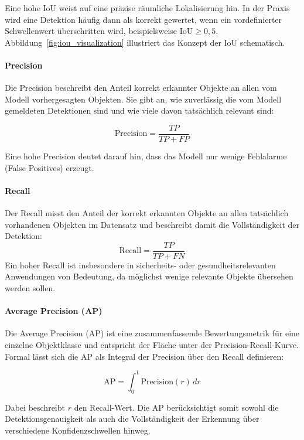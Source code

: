 Eine hohe IoU weist auf eine präzise räumliche Lokalisierung hin. In der Praxis
wird eine Detektion häufig dann als korrekt gewertet, wenn ein vordefinierter
Schwellenwert überschritten wird, beispielsweise $\text{IoU} \geq 0{,}5$.
Abbildung~\ref{fig:iou_visualization} illustriert das Konzept der IoU
schematisch.

\paragraph{Precision}
Die Precision beschreibt den Anteil korrekt erkannter Objekte an allen vom Modell
vorhergesagten Objekten. Sie gibt an, wie zuverlässig die vom Modell gemeldeten
Detektionen sind und wie viele davon tatsächlich relevant sind:

\begin{equation}
    \text{Precision} = \frac{TP}{TP + FP}
\end{equation}

Eine hohe Precision deutet darauf hin, dass das Modell nur wenige Fehlalarme
(False Positives) erzeugt.

\paragraph{Recall}
Der Recall misst den Anteil der korrekt erkannten Objekte an allen tatsächlich
vorhandenen Objekten im Datensatz und beschreibt damit die Vollständigkeit der
Detektion:
\begin{equation}
    \text{Recall} = \frac{TP}{TP + FN}
\end{equation}
Ein hoher Recall ist insbesondere in sicherheits- oder gesundheitsrelevanten
Anwendungen von Bedeutung, da möglichst wenige relevante Objekte übersehen werden
sollen.

\paragraph{Average Precision (AP)}
Die Average Precision (AP) ist eine zusammenfassende Bewertungsmetrik für eine
einzelne Objektklasse und entspricht der Fläche unter der Precision-Recall-Kurve.
Formal lässt sich die AP als Integral der Precision über den Recall definieren:

\begin{equation}
    \text{AP} = \int_{0}^{1} \text{Precision}(r)\, dr
\end{equation}

Dabei beschreibt $r$ den Recall-Wert. Die AP berücksichtigt somit sowohl die
Detektionsgenauigkeit als auch die Vollständigkeit der Erkennung über verschiedene
Konfidenzschwellen hinweg.

